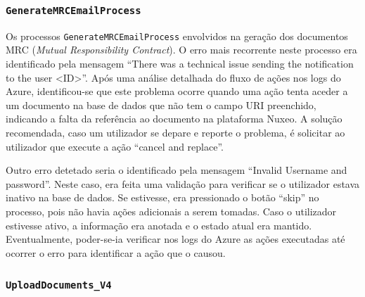         \subsubsection{\texttt{GenerateMRCEmailProcess}}\label{secsec:generate_mrc_email_process}

            Os processos \texttt{GenerateMRCEmailProcess} envolvidos na geração dos documentos MRC (\textit{Mutual Responsibility Contract}). O erro mais recorrente neste processo era identificado pela mensagem ``There was a technical issue sending the notification to the user <ID>''. Após uma análise detalhada do fluxo de ações nos logs do Azure, identificou-se que este problema ocorre quando uma ação tenta aceder a um documento na base de dados que não tem o campo URI preenchido, indicando a falta da referência ao documento na plataforma Nuxeo. A solução recomendada, caso um utilizador se depare e reporte o problema, é solicitar ao utilizador que execute a ação ``cancel and replace''.

            Outro erro detetado seria o identificado pela mensagem ``Invalid Username and password''. Neste caso, era feita uma validação para verificar se o utilizador estava inativo na base de dados. Se estivesse, era pressionado o botão ``skip'' no processo, pois não havia ações adicionais a serem tomadas. Caso o utilizador estivesse ativo, a informação era anotada e o estado atual era mantido. Eventualmente, poder-se-ia verificar nos logs do Azure as ações executadas até ocorrer o erro para identificar a ação que o causou.



        \subsubsection{\texttt{UploadDocuments\_V4}}\label{secsec:uploaddocuments_v4}

